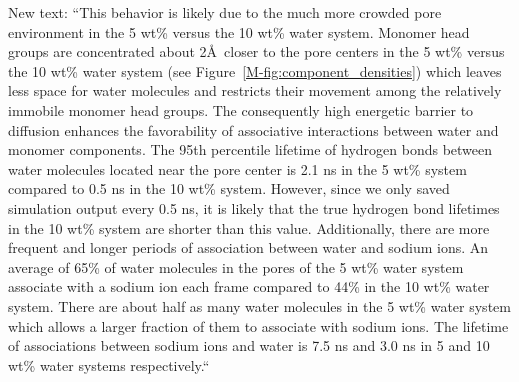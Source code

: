 \documentclass{article}
\begin{document}
\begin{enumerate}
    New text: ``This behavior is likely due to the much more crowded pore environment
    in the 5 wt\% versus the 10 wt\% water system. Monomer head groups are
    concentrated about 2\AA~closer to the pore centers in the 5 wt\% versus the 10 
    wt\% water system (see Figure~\ref{M-fig:component_densities})  %
    which leaves less space for water molecules and restricts their movement among the 
    relatively immobile monomer head groups. 
    The consequently high energetic barrier to diffusion enhances the favorability of 
    associative interactions between water and monomer components.
    The 95th percentile lifetime of hydrogen bonds between water molecules located near the
	pore center is 2.1 ns in the 5 wt\% system compared to 0.5 ns in the 10 wt\% system. 
	However, since we only saved simulation output every 0.5 ns, it is likely that the 
	true hydrogen bond lifetimes in the 10 wt\% system are 
        shorter
        than this value.
	Additionally, there are more frequent and longer periods of association between water
	and sodium ions. An average of 65\% of water molecules in the pores of the 5 wt\% water
	system associate with a sodium ion each frame compared to 44\% in the 10 wt\% water system.
	There are about half as many water molecules in the 5 wt\% water system which allows a 
	larger fraction of them to associate with sodium ions. The lifetime of associations
	between sodium ions and water is 7.5 ns and 3.0 ns in 5 and 10 wt\% water systems respectively.``
	

\end{enumerate}
\end{document}
